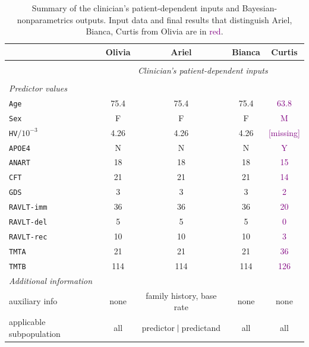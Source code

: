 \documentclass[a4paper,12pt,%
onecolumn,oneside,article,%
british%
]{memoir}
\theoremstyle{remark}
\theoremstyle{innote}
\renewcommand*{\|}[1][]{\nonscript\:#1\vert\nonscript\:\mathopen{}}
\newcommand*{\age}{\texttt{Age}}
\newcommand*{\sex}{\texttt{Sex}}
\newcommand*{\apoe}{\texttt{APOE4}}
\newcommand*{\hv}{\texttt{HV}}
\newcommand*{\anart}{\texttt{ANART}}
\newcommand*{\cft}{\texttt{CFT}}
\newcommand*{\gds}{\texttt{GDS}}
\newcommand*{\ravltimm}{\texttt{RAVLT-imm}}
\newcommand*{\ravltdel}{\texttt{RAVLT-del}}
\newcommand*{\ravltrec}{\texttt{RAVLT-rec}}
\newcommand*{\tmta}{\texttt{TMTA}}
\newcommand*{\tmtb}{\texttt{TMTB}}
\begin{document}
\begin{table}\footnotesize
  \centering
  \caption{Summary of the clinician's patient-dependent inputs and Bayesian-nonparametrics outputs. Input data and final results that distinguish Ariel, Bianca, Curtis from Olivia are in \textcolor{purple}{red}.}\label{tab:summary}

\medskip
  \begin{tabularx}{\linewidth}{Xcccc}
    &{\footnotesize Olivia} &{\footnotesize Ariel} &{\footnotesize Bianca} &{\footnotesize Curtis}
    \\[\jot]
    \hline\\[-1.5\jot]
    &\multicolumn{4}{c}{\textit{\footnotesize Clinician's patient-dependent inputs}}
    \\\hline \\[-\jot]
    \emph{\footnotesize Predictor values}&&&& \\[\jot]
    \age&75.4&75.4&75.4&\textcolor{purple}{63.8} \\
    \sex&F&F&F&\textcolor{purple}{M} \\
    \hv${}/10^{-3}$&4.26&4.26&4.26&\textcolor{purple}{[missing]} \\
    \apoe&N&N&N&\textcolor{purple}{Y} \\
    \anart&18&18&18&\textcolor{purple}{15} \\
    \cft&21&21&21&\textcolor{purple}{14} \\
    \gds&3&3&3&\textcolor{purple}{2} \\
    \ravltimm&36&36&36&\textcolor{purple}{20} \\
    \ravltdel&5&5&5&\textcolor{purple}{0} \\
    \ravltrec&10&10&10&\textcolor{purple}{3} \\
    \tmta&21&21&21&\textcolor{purple}{36} \\
    \tmtb&114&114&114&\textcolor{purple}{126}
    \\[2\jot] %
    \emph{\footnotesize Additional information}&&&& \\[\jot]
    {\scriptsize auxiliary info}&
    {\scriptsize none}&
    \parbox{6em}{\centering\scriptsize\color{purple} family history, base rate}&
    {\scriptsize none}&
    {\scriptsize none}\\[2\jot]
    {\scriptsize applicable subpopulation}&
    {\scriptsize all}&
    {\scriptsize\color{purple} predictor$\|$predictand}&
    {\scriptsize all}&
    {\scriptsize all}\\[2\jot]

\end{tabularx}
\end{table}
\end{document}
